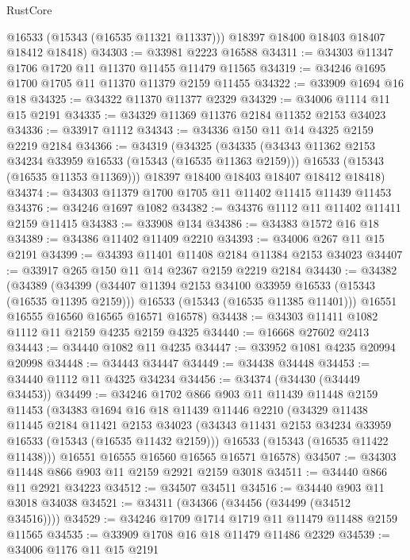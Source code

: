 \begin{lexlean}{RustCore}
\begin{coremodule}
        @16533
        (@15343 (@16535 @11321 @11337)))
      @18397
      @18400
      @18403
      @18407
      @18412
      @18418)
@34303 := @33981 @2223 @16588
@34311 := @34303 @11347 @1706 @1720 @11 @11370 @11455 @11479 @11565
@34319 := @34246 @1695 @1700 @1705 @11 @11370 @11379 @2159 @11455
@34322 := @33909 @1694 @16 @18
@34325 := @34322 @11370 @11377 @2329
@34329 := @34006 @1114 @11 @15 @2191
@34335 := @34329 @11369 @11376 @2184 @11352 @2153 @34023
@34336 := @33917 @1112
@34343 := @34336 @150 @11 @14 @4325 @2159 @2219 @2184
@34366 := @34319
    (@34325
      (@34335
        (@34343 @11362 @2153 @34234 @33959 @16533 (@15343 (@16535 @11363 @2159)))
        @16533
        (@15343 (@16535 @11353 @11369)))
      @18397
      @18400
      @18403
      @18407
      @18412
      @18418)
@34374 := @34303 @11379 @1700 @1705 @11 @11402 @11415 @11439 @11453
@34376 := @34246 @1697 @1082
@34382 := @34376 @1112 @11 @11402 @11411 @2159 @11415
@34383 := @33908 @134
@34386 := @34383 @1572 @16 @18
@34389 := @34386 @11402 @11409 @2210
@34393 := @34006 @267 @11 @15 @2191
@34399 := @34393 @11401 @11408 @2184 @11384 @2153 @34023
@34407 := @33917 @265 @150 @11 @14 @2367 @2159 @2219 @2184
@34430 := @34382
    (@34389
      (@34399
        (@34407 @11394 @2153 @34100 @33959 @16533 (@15343 (@16535 @11395 @2159)))
        @16533
        (@15343 (@16535 @11385 @11401)))
      @16551
      @16555
      @16560
      @16565
      @16571
      @16578)
@34438 := @34303 @11411 @1082 @1112 @11 @2159 @4235 @2159 @4325
@34440 := @16668 @27602 @2413
@34443 := @34440 @1082 @11 @4235
@34447 := @33952 @1081 @4235 @20994 @20998
@34448 := @34443 @34447
@34449 := @34438 @34448
@34453 := @34440 @1112 @11 @4325 @34234
@34456 := @34374 (@34430 (@34449 @34453))
@34499 := @34246
    @1702
    @866
    @903
    @11
    @11439
    @11448
    @2159
    @11453
    (@34383
      @1694
      @16
      @18
      @11439
      @11446
      @2210
      (@34329
        @11438
        @11445
        @2184
        @11421
        @2153
        @34023
        (@34343 @11431 @2153 @34234 @33959 @16533 (@15343 (@16535 @11432 @2159)))
        @16533
        (@15343 (@16535 @11422 @11438)))
      @16551
      @16555
      @16560
      @16565
      @16571
      @16578)
@34507 := @34303 @11448 @866 @903 @11 @2159 @2921 @2159 @3018
@34511 := @34440 @866 @11 @2921 @34223
@34512 := @34507 @34511
@34516 := @34440 @903 @11 @3018 @34038
@34521 := @34311 (@34366 (@34456 (@34499 (@34512 @34516))))
@34529 := @34246 @1709 @1714 @1719 @11 @11479 @11488 @2159 @11565
@34535 := @33909 @1708 @16 @18 @11479 @11486 @2329
@34539 := @34006 @1176 @11 @15 @2191

\end{coremodule}
\end{lexlean}
